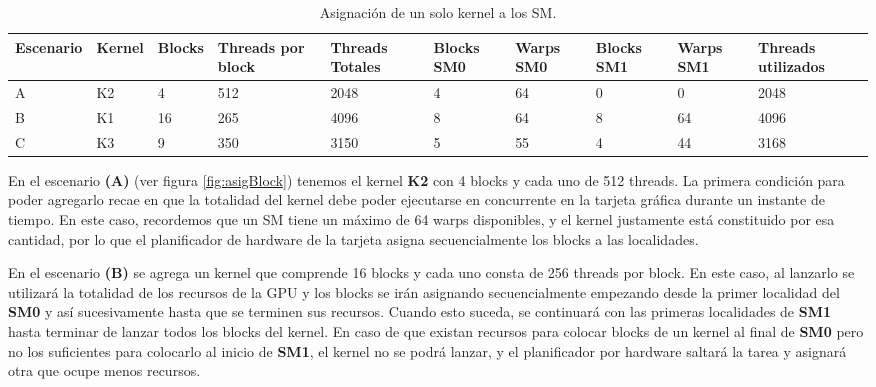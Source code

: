   \begin{table}[h!]
      \begin{center}
            \scriptsize
        \begin{tabular}{|m{1.5cm}|m{1cm}|m{1cm}|m{1.5cm}|m{1.5cm}|m{1cm}|m{1cm}|m{1cm}|m{1cm}|m{1.5cm}|}
         \hline
         \cellcolor{lightgray}\textbf{Escenario} &
         \cellcolor{lightgray}\textbf{Kernel} & 
         \cellcolor{lightgray}\textbf{Blocks} &
         \cellcolor{lightgray}\textbf{Threads por block} &
         \cellcolor{lightgray}\textbf{Threads Totales} &
         \cellcolor{lightgray}\textbf{Blocks SM0} &
         \cellcolor{lightgray}\textbf{Warps SM0} &
         \cellcolor{lightgray}\textbf{Blocks SM1} &
         \cellcolor{lightgray}\textbf{Warps SM1} &
         \cellcolor{lightgray}\textbf{Threads utilizados}\\ 
         \hline
         A & K2 & 4 & 512 & 2048 & 4 & 64 & 0 & 0 & 2048\\ 
         \hline
         B & K1 & 16 & 265 & 4096 & 8 & 64 & 8 & 64 & 4096\\ 
         \hline
         C & K3 & 9 & 350 & 3150 & 5 & 55 & 4 & 44 & 3168\\ 
         \hline
           \end{tabular}
        \caption{Asignación de un solo kernel a los SM.}
        \label{tab:asigUnKernelSM}
      \end{center}
    \end{table}
    
    En el escenario \textbf{(A)} (ver figura \ref{fig:asigBlock}) tenemos el kernel \textbf{K2} con 4 blocks y cada uno de 512 threads. La primera condición para poder agregarlo recae en que la totalidad del kernel debe poder ejecutarse en concurrente en la tarjeta gráfica durante un  instante de tiempo. En este caso, recordemos que un SM tiene un máximo de 64 warps disponibles, y el kernel justamente está constituido por esa cantidad, por lo que el planificador de hardware de la tarjeta asigna secuencialmente los blocks a las localidades.
    \newline
    
    En el escenario \textbf{(B)} se agrega un kernel que comprende 16 blocks y cada uno consta de 256 threads por block. En este caso, al lanzarlo se utilizará la totalidad de los recursos de la GPU y los blocks se irán asignando secuencialmente empezando desde la primer localidad del \textbf{SM0} y así sucesivamente hasta que se terminen sus recursos. Cuando esto suceda, se continuará con las primeras localidades de \textbf{SM1} hasta terminar de lanzar todos los blocks del kernel. En caso de que existan recursos para colocar blocks de un kernel al final de \textbf{SM0} pero no los suficientes para colocarlo al inicio de \textbf{SM1}, el kernel no se podrá lanzar, y el planificador por hardware saltará la tarea y asignará otra que ocupe menos recursos.
    \newline
    
